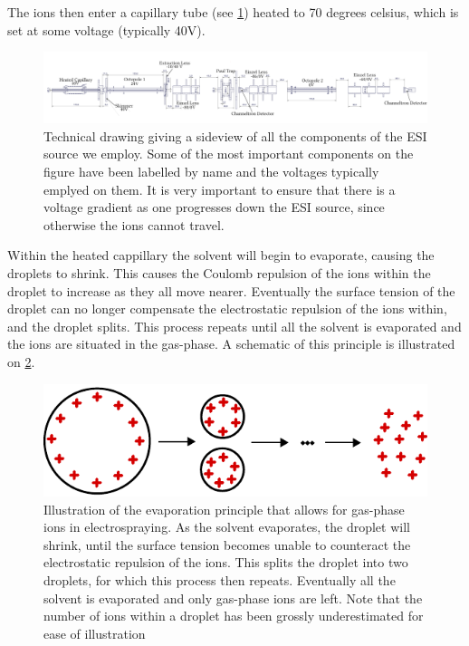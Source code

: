 The ions then enter a capillary tube (see \cref{fig:esiDrawing}) heated to 70 degrees celsius, which is set at some voltage (typically 40V).
\begin{figure}
    \centering
    \includegraphics[width = 1.1\textwidth]{main/electrospray_elements.pdf}
    \caption{Technical drawing giving a sideview of all the components of the ESI source we employ. Some of the most important components on the figure have been labelled by name and the voltages typically emplyed on them.
    It is very important to ensure that there is a voltage gradient as one progresses down the ESI source, since otherwise the ions cannot travel.}
    \label{fig:esiDrawing}
\end{figure}
Within the heated cappillary the solvent will begin to evaporate, causing the droplets to shrink. This causes the Coulomb repulsion of the ions within the droplet to increase as they all move nearer.
Eventually the surface tension of the droplet can no longer compensate the electrostatic repulsion of the ions within, and the droplet splits. This process repeats until all the solvent is evaporated and the ions are situated in the gas-phase. A schematic of this principle is illustrated on \cref{fig:evaporation}.
\begin{figure}
    \centering
    \includegraphics{main/evaporation.pdf}
    \caption{Illustration of the evaporation principle that allows for gas-phase ions in electrospraying. As the solvent evaporates, the droplet will shrink, until the surface tension becomes unable to counteract the electrostatic repulsion of the ions. This splits the droplet into two droplets, for which this process then repeats. Eventually all the solvent is evaporated and only gas-phase ions are left. Note that the number of ions within a droplet has been grossly underestimated for ease of illustration}
    \label{fig:evaporation}
\end{figure}

